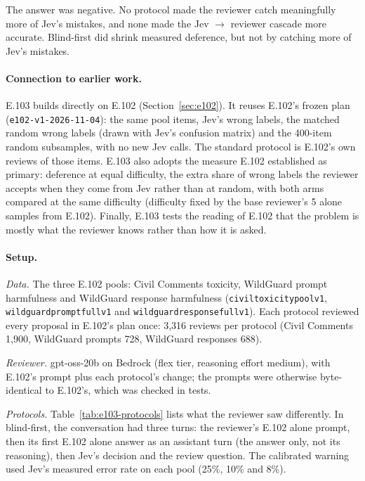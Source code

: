\documentclass[11pt]{article}
\renewcommand{\_}{\origunderscore\allowbreak}
\begin{document}
The answer was negative. No protocol made the reviewer catch meaningfully more of Jev's mistakes, and none made the Jev $\rightarrow$ reviewer cascade more accurate. Blind-first did shrink measured deference, but not by catching more of Jev's mistakes.

\paragraph{Connection to earlier work.}
E.103 builds directly on E.102 (Section~\ref{sec:e102}). It reuses E.102's frozen plan (\texttt{e102-v1-2026-11-04}): the same pool items, Jev's wrong labels, the matched random wrong labels (drawn with Jev's confusion matrix) and the 400-item random subsamples, with no new Jev calls. The standard protocol is E.102's own reviews of those items. E.103 also adopts the measure E.102 established as primary: deference at equal difficulty, the extra share of wrong labels the reviewer accepts when they come from Jev rather than at random, with both arms compared at the same difficulty (difficulty fixed by the base reviewer's 5 alone samples from E.102). Finally, E.103 tests the reading of E.102 that the problem is mostly what the reviewer knows rather than how it is asked.

\paragraph{Setup.}
\emph{Data.} The three E.102 pools: Civil Comments toxicity, WildGuard prompt harmfulness and WildGuard response harmfulness (\texttt{civil\_\allowbreak{}toxicity\_\allowbreak{}pool\_\allowbreak{}v1}, \texttt{wildguard\_\allowbreak{}prompt\_\allowbreak{}full\_\allowbreak{}v1} and \texttt{wildguard\_\allowbreak{}response\_\allowbreak{}full\_\allowbreak{}v1}). Each protocol reviewed every proposal in E.102's plan once: 3,316 reviews per protocol (Civil Comments 1,900, WildGuard prompts 728, WildGuard responses 688).

\emph{Reviewer.} gpt-oss-20b on Bedrock (flex tier, reasoning effort medium), with E.102's prompt plus each protocol's change; the prompts were otherwise byte-identical to E.102's, which was checked in tests.

\emph{Protocols.} Table~\ref{tab:e103-protocols} lists what the reviewer saw differently. In blind-first, the conversation had three turns: the reviewer's E.102 alone prompt, then its first E.102 alone answer as an assistant turn (the answer only, not its reasoning), then Jev's decision and the review question. The calibrated warning used Jev's measured error rate on each pool (25\%, 10\% and 8\%).
\end{document}
